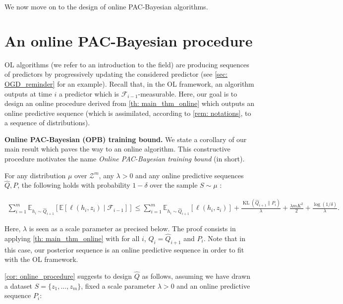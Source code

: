 We now move on to the design of online PAC-Bayesian algorithms.


\section{An online PAC-Bayesian procedure}

\label{sec: online_pacb_procedure}

OL algorithms (we refer to \citealp{hazan2016introduction}  an introduction to the field) are producing sequences of predictors by progressively updating the considered predictor (see \cref{sec: OGD_reminder} for an example). Recall that, in the OL framework, an algorithm outputs at time $i$ a predictor which is $\mathcal{F}_{i-1}$-measurable. Here, our goal is to design an online procedure derived from \cref{th: main_thm_online} which outputs an online predictive sequence (which is assimilated, according to \cref{rem: notations}, to a sequence of distributions).


\textbf{Online PAC-Bayesian (OPB) training bound.} We state a corollary of our main result which paves the way to an online algorithm. This constructive procedure motivates the name \emph{ Online PAC-Bayesian training bound} (\OPBTrain in short).

\begin{corollary}
  \label{cor: online_procedure}
  For any distribution $\mu$ over $\mathcal{Z}^m$, any $\lambda>0$ and any online predictive sequences $\hat{Q},P$, the following holds with probability $1-\delta$ over the sample $S\sim \mu$ :

  \begin{align*}
    \sum_{i=1}^m \mathbb{E}_{h_i\sim \hat{Q}_{i+1}}\left[ \mathbb{E}[\ell(h_i,z_i) \mid \mathcal{F}_{i-1}]    \right] \leq \sum_{i=1}^m \mathbb{E}_{h_i\sim \hat{Q}_{i+1}}\left[ \ell(h_i,z_i) \right] + \frac{\operatorname{KL}(\hat{Q}_{i+1}\| P_i)}{\lambda} + \frac{\lambda m K^2}{2} + \frac{\log(1/\delta)}{\lambda}.
  \end{align*}
\end{corollary}
Here, $\lambda$ is seen as a scale parameter as precised below.
The proof consists in applying \cref{th: main_thm_online} with for all $i$, $Q_i= \hat{Q}_{i+1}$ and $P_i$.
Note that in this case, our posterior sequence is an online predictive sequence in order to fit with the OL framework.


\cref{cor: online_procedure} suggests to design $\hat{Q}$ as follows, assuming we have drawn a dataset $S= \{z_1,...,z_m\}$, fixed a scale parameter $\lambda>0$  and an online predictive sequence $P_i$:

